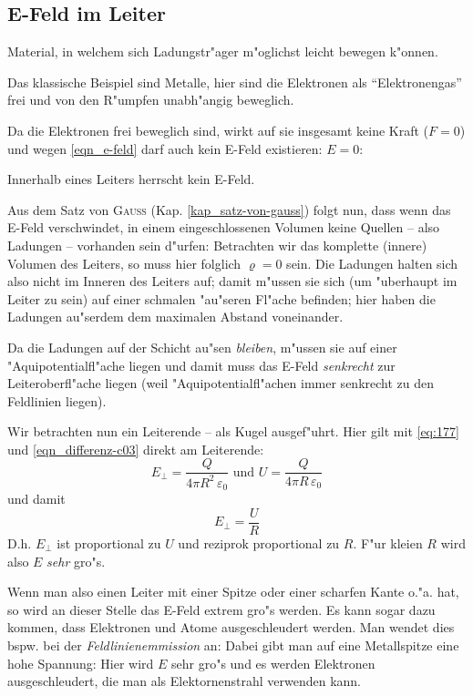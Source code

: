\subsection{E-Feld im Leiter}
\label{kap_e-feld-im-leiter}

\begin{Def}
    Material, in welchem sich Ladungstr"ager
   m"oglichst leicht bewegen k"onnen.
\end{Def}
Das klassische Beispiel sind Metalle, hier sind die Elektronen als
"`Elektronengas"' frei und von den R"umpfen
unabh"angig beweglich.

Da die Elektronen frei beweglich sind, wirkt auf sie insgesamt keine
Kraft ($F = 0$)  und wegen \eqref{eqn_e-feld} darf auch kein E-Feld
existieren: $E = 0$:
\begin{Wichtig}
   Innerhalb eines Leiters herrscht kein E-Feld.
\end{Wichtig}

Aus dem Satz von \textsc{Gauss} (Kap. \ref{kap_satz-von-gauss}) folgt
nun, dass wenn das E-Feld verschwindet, in einem eingeschlossenen
Volumen keine Quellen -- also Ladungen -- vorhanden sein d"urfen:
Betrachten wir das komplette (innere) Volumen des Leiters, so muss
hier folglich $\varrho = 0$ sein. Die Ladungen halten sich also nicht
im Inneren des Leiters auf; damit m"ussen sie sich (um "uberhaupt im
Leiter zu sein) auf einer schmalen "au"seren Fl"ache befinden; hier haben
die Ladungen au"serdem dem maximalen Abstand voneinander.

Da die Ladungen auf der Schicht au"sen \emph{bleiben}, m"ussen sie auf
einer "Aquipotentialfl"ache liegen und damit muss das E-Feld
\emph{senkrecht} zur Leiteroberfl"ache liegen (weil
"Aquipotentialfl"achen immer senkrecht zu den Feldlinien liegen).

\begin{Beispiel}
Wir betrachten nun ein Leiterende -- als Kugel ausgef"uhrt. Hier gilt
mit \eqref{eq:177} und \eqref{eqn_differenz-c03} direkt am Leiterende:
$$
E_\bot = \frac{Q}{4\pi R^2\, \varepsilon_0} \text{ und } U =
\frac{Q}{4\pi R\, \varepsilon_0}
$$
und damit
$$
E_\bot = \frac{U}{R}
$$
D.h. $E_\bot$ ist proportional zu $U$ und reziprok %
proportional zu $R$. F"ur kleien $R$ wird also $E$ \emph{sehr} gro"s.

Wenn man also einen Leiter mit einer Spitze oder einer scharfen Kante
o."a. hat, so wird an dieser Stelle das E-Feld extrem gro"s werden. Es
kann sogar dazu kommen, dass Elektronen und Atome ausgeschleudert
werden. Man wendet dies bspw. bei der
\emph{Feldlinienemmission} an: Dabei gibt
man auf eine Metallspitze eine hohe Spannung: Hier wird $E$ sehr gro"s
und es werden Elektronen ausgeschleudert, die man als Elektornenstrahl
verwenden kann.
\end{Beispiel}

